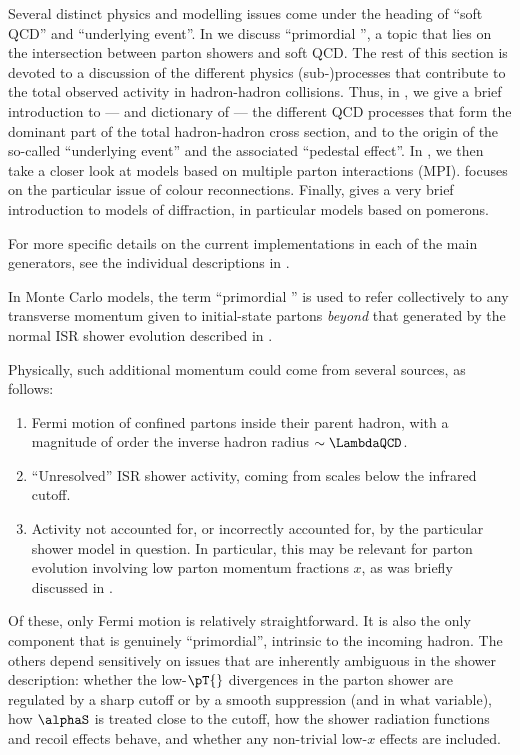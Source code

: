 Several distinct physics and modelling issues come under the 
heading of ``soft QCD'' and ``underlying event''. In   
we discuss ``primordial \kT'', a
topic that lies on the intersection between parton showers and
soft QCD.
The rest of this section is  devoted to a discussion of
the different physics (sub-)processes that  contribute to the total
observed activity in hadron-hadron collisions. 
Thus, in , we give a brief introduction to --- and
dictionary of --- the different 
QCD processes that form the dominant part of the total hadron-hadron
cross section, and to the origin of the so-called ``underlying event''
and the associated ``pedestal effect''.
In , we then 
take a closer look at models based on multiple parton interactions
(MPI).  focuses on the particular issue of colour
reconnections. 
Finally,  gives a very brief introduction to models
of diffraction, in particular models based on pomerons. 

For more specific details on the current implementations in each of
the main generators, see the individual descriptions in
. 


In Monte Carlo models, the term ``primordial \kT'' is used to refer
collectively to any transverse momentum given to initial-state
partons \emph{beyond} that generated by the normal ISR shower
evolution described in .  

Physically, such additional momentum could come from several
sources, as follows:
\begin{enumerate}
\item Fermi motion of confined
partons inside their parent hadron, with a magnitude of order the
inverse hadron radius $\sim \LambdaQCD$.  
\item ``Unresolved'' ISR shower activity, coming from scales 
below the infrared cutoff.
\item Activity not accounted for, or incorrectly accounted for, 
by the particular shower model in question. In particular, this may be
relevant for parton evolution involving 
low parton momentum fractions $x$, as was briefly
discussed in .
\end{enumerate}
Of these, only Fermi motion is relatively straightforward.
It is also the only component that is genuinely
``primordial'', \ie intrinsic to the incoming hadron.
The others depend sensitively on issues that are
inherently ambiguous in the shower description: whether the
low-$\pT{}$ divergences in the parton shower are regulated by a sharp
cutoff or by a smooth 
suppression (and in what variable), how $\alphaS$ is treated close to
the cutoff, how the shower radiation functions and recoil effects 
behave, and whether any non-trivial low-$x$ effects are included. 

